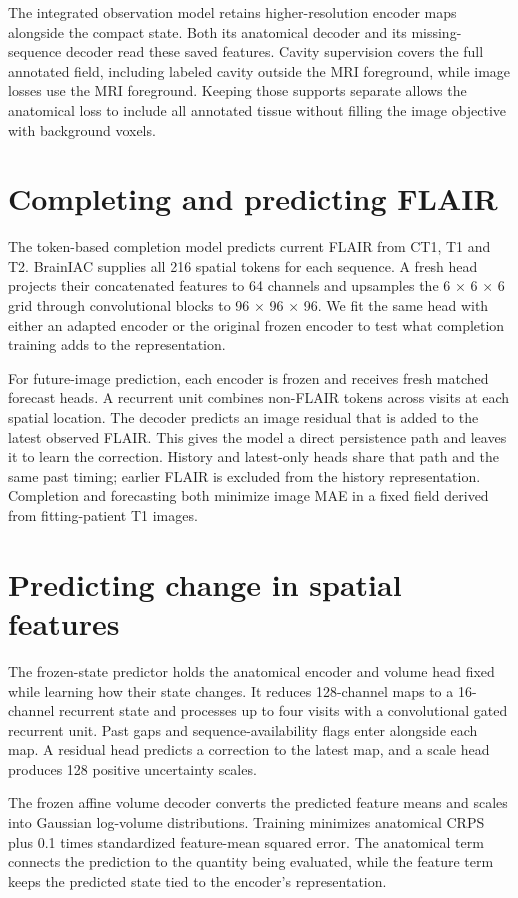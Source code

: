 The integrated observation model retains higher-resolution encoder maps alongside the compact state. Both its anatomical decoder and its missing-sequence decoder read these saved features. Cavity supervision covers the full annotated field, including labeled cavity outside the MRI foreground, while image losses use the MRI foreground. Keeping those supports separate allows the anatomical loss to include all annotated tissue without filling the image objective with background voxels.

\section{Completing and predicting FLAIR}

The token-based completion model predicts current FLAIR from CT1, T1 and T2. BrainIAC supplies all 216 spatial tokens for each sequence. A fresh head projects their concatenated features to 64 channels and upsamples the 6 × 6 × 6 grid through convolutional blocks to 96 × 96 × 96. We fit the same head with either an adapted encoder or the original frozen encoder to test what completion training adds to the representation.

For future-image prediction, each encoder is frozen and receives fresh matched forecast heads. A recurrent unit combines non-FLAIR tokens across visits at each spatial location. The decoder predicts an image residual that is added to the latest observed FLAIR. This gives the model a direct persistence path and leaves it to learn the correction. History and latest-only heads share that path and the same past timing; earlier FLAIR is excluded from the history representation. Completion and forecasting both minimize image MAE in a fixed field derived from fitting-patient T1 images.

\section{Predicting change in spatial features}

The frozen-state predictor holds the anatomical encoder and volume head fixed while learning how their state changes. It reduces 128-channel maps to a 16-channel recurrent state and processes up to four visits with a convolutional gated recurrent unit. Past gaps and sequence-availability flags enter alongside each map. A residual head predicts a correction to the latest map, and a scale head produces 128 positive uncertainty scales.

The frozen affine volume decoder converts the predicted feature means and scales into Gaussian log-volume distributions. Training minimizes anatomical CRPS plus 0.1 times standardized feature-mean squared error. The anatomical term connects the prediction to the quantity being evaluated, while the feature term keeps the predicted state tied to the encoder's representation.

